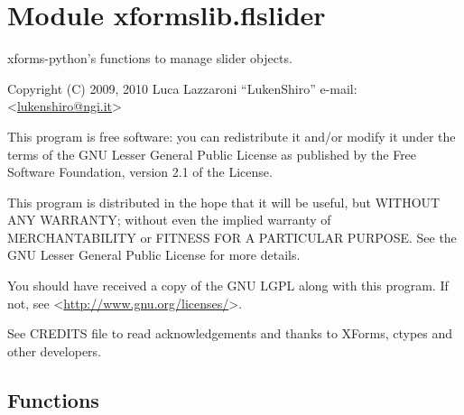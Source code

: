 %
%
%


\section{Module xformslib.flslider}

    \label{xformslib:flslider}

xforms-python's functions to manage slider objects.

Copyright (C) 2009, 2010  Luca Lazzaroni ``LukenShiro''
e-mail: <\href{mailto:lukenshiro@ngi.it}{lukenshiro@ngi.it}>

This program is free software: you can redistribute it and/or modify
it under the terms of the GNU Lesser General Public License as
published by the Free Software Foundation, version 2.1 of the License.

This program is distributed in the hope that it will be useful,
but WITHOUT ANY WARRANTY; without even the implied warranty of
MERCHANTABILITY or FITNESS FOR A PARTICULAR PURPOSE. See the
GNU Lesser General Public License for more details.

You should have received a copy of the GNU LGPL along with this
program. If not, see <\href{http://www.gnu.org/licenses/}{http://www.gnu.org/licenses/}>.

See CREDITS file to read acknowledgements and thanks to XForms,
ctypes and other developers.


  \subsection{Functions}

    \label{xformslib:flslider:fl_add_slider}


